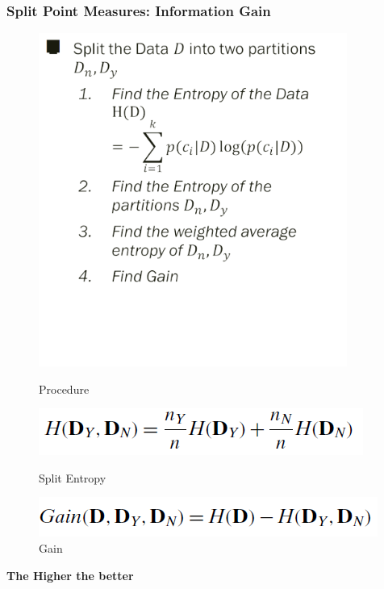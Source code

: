\begin{itemize}
\subsubsection{Split Point Measures: Information Gain}
\begin{figure}[H]
    \centering
    \begin{minipage}{0.6\textwidth}
        \centering
        \includegraphics[width=0.9\textwidth]{Figures/dt2.png} %
        \caption{Procedure}
    \end{minipage}\hfill
    \begin{minipage}{0.4\textwidth}
        \centering
        \includegraphics[width=\textwidth]{Figures/dt3.png} %
        \caption{Split Entropy}
    \end{minipage}
        \begin{minipage}{0.4\textwidth}
        \centering
        \includegraphics[width=\textwidth]{Figures/dt4.png} %
        \caption{Gain}
    \end{minipage}
\end{figure}
\textbf{The Higher the better}

\end{itemize}
